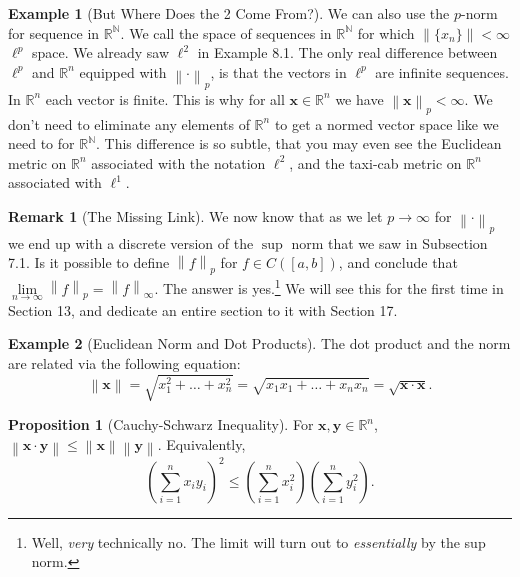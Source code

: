 \documentclass{article}
\newcommand{\N}{\mathbb{N}}
\newcommand{\R}{\mathbb{R}}
\newcommand{\x}{\mathbf{x}}
\newcommand{\y}{\mathbf{y}}
\newcommand{\norm}[1]{\left\lVert#1\right\rVert}
\theoremstyle{definition}
\newtheorem{proposition}{Proposition}[section]
\newtheorem{example}{Example}[section]
\newtheorem{remark}{Remark}[section]
\begin{document}
\begin{example}[But Where Does the 2 Come From?]
	
	We can also use the $ p $-norm for sequence in $ \R^\N $. We call the space of sequences in $ \R^\N $ for which $ \norm{\{x_n\}}<\infty $ $ \ell^p $ space. We already saw $ \ell^2 $ in Example 8.1. The only real difference between $ \ell^p $ and $ \R^n $ equipped with $ \norm{\cdot}_p $, is that the vectors in $ \ell^p $ are infinite sequences. In $ \R^n $ each vector is finite. This is why for all $ \x\in\R^n $ we have $ \norm{\x}_p<\infty $. We don't need to eliminate any elements of $ \R^n $ to get a normed vector space like we need to for $ \R^\N $. This difference is so subtle, that you may even see the Euclidean metric on $ \R^n $ associated with the notation $ \ell^2 $, and the taxi-cab metric on $ \R^n $ associated with $ \ell^1 $.  
\end{example}
\begin{remark}[The Missing Link]
	We now know that as we let $ p\to\infty $ for $ \norm{\cdot}_p $ we end up with a discrete version of the $ \sup $ norm that we saw in Subsection 7.1. Is it possible to define $ \norm{f}_p $ for $ f\in C([a,b]) $, and conclude that $ \lim\limits_{n\to\infty}\norm{f}_p=\norm{f}_\infty $. The answer is yes.\footnote{Well, \textit{very} technically no. The limit will turn out to \textit{essentially} by the sup norm.} We will see this for the first time in Section 13, and dedicate an entire section to it with Section 17.
\end{remark}
\begin{example}[Euclidean Norm and Dot Products]
The dot product and the norm are related via the following equation:
$$ \norm{\x}=\sqrt{x_1^2+\ldots+x_n^2}=\sqrt{x_1x_1+\ldots+x_nx_n}=\sqrt{\x\cdot\x}.$$
\end{example}
\begin{proposition}[Cauchy-Schwarz Inequality]
	For $ \x,\y\in\R^n $, $\norm{\x\cdot\y}\le \norm{\x}\norm{\y} $. Equivalently, 
	$$ \left(\sum_{i=1}^{n}x_iy_i\right)^2\le \left(\sum_{i=1}^n x_i^2\right)\left(\sum_{i=1}^n y_i^2\right).$$
\end{proposition}
\end{document}
